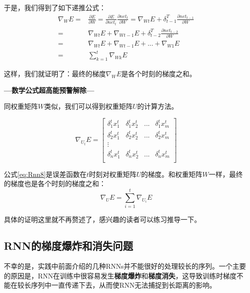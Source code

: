 于是，我们得到了如下递推公式：
\begin{align*}
	\nabla_WE= & \frac{\partial{E}}{\partial{W}}=\frac{\partial{E}}{\partial{{net}_t}}\frac{\partial{{net}_t}}{\partial{W}}=\nabla_{Wt}E+\delta_{t-1}^T\frac{\partial{{net}_{t-1}}}{\partial{W}} \\
	=          & \nabla_{Wt}E+\nabla_{Wt-1}E+\delta_{t-2}^T\frac{\partial{{net}_{t-2}}}{\partial{W}}                                                                                             \\
	=          & \nabla_{Wt}E+\nabla_{Wt-1}E+...+\nabla_{W1}E                                                                                                                                    \\
	=          & \sum_{k=1}^t\nabla_{Wk}E
\end{align*}

这样，我们就证明了：最终的梯度\(\nabla_WE\)是各个时刻的梯度之和。

\textbf{---数学公式超高能预警解除---}

同权重矩阵$W$类似，我们可以得到权重矩阵$U$的计算方法。

\begin{equation}
	\label{eq:Rnn8}
	\nabla_{U_t}E=\begin{bmatrix}
		\delta_1^tx_1^t & \delta_1^tx_2^t & ... & \delta_1^tx_m^t \\
		\delta_2^tx_1^t & \delta_2^tx_2^t & ... & \delta_2^tx_m^t \\
		\vdots                                                    \\
		\delta_n^tx_1^t & \delta_n^tx_2^t & ... & \delta_n^tx_m^t \\
	\end{bmatrix}
\end{equation}

公式\ref{eq:Rnn8}是误差函数在$t$时刻对权重矩阵$U$的梯度。和权重矩阵$W$一样，最终的梯度也是各个时刻的梯度之和：
\[
	\nabla_UE=\sum_{i=1}^t\nabla_{U_i}E
\]

具体的证明这里就不再赘述了，感兴趣的读者可以练习推导一下。

\subsection{RNN的梯度爆炸和消失问题}\label{Rnn:8}

不幸的是，实践中前面介绍的几种RNNs并不能很好的处理较长的序列。一个主要的原因是，RNN在训练中很容易发生\textbf{梯度爆炸}和\textbf{梯度消失}，这导致训练时梯度不能在较长序列中一直传递下去，从而使RNN无法捕捉到长距离的影响。

